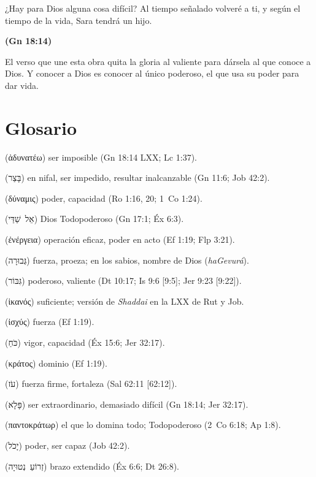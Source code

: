 \documentclass[11pt,letterpaper]{article}
\newcommand{\heb}[1]{\mbox{\foreignlanguage{hebrew}{#1}}}
\newcommand{\grc}[1]{\foreignlanguage{ancientgreek}{#1}}
\newcommand{\fuente}[1]{\par\hfill{\upshape\bfseries\small\textcolor{azul}{#1}}}
\begin{document}
\begin{cita}¿Hay para Dios alguna cosa difícil? Al tiempo señalado volveré a ti, y según el tiempo de la vida, Sara tendrá un hijo.\fuente{(Gn 18:14)}\end{cita}

El verso que une esta obra quita la gloria al valiente para dársela al que conoce a Dios. Y conocer a Dios es conocer al único poderoso, el que usa su poder para dar vida.

\section*{Glosario}

\begin{description}\setlength{\itemsep}{2pt}
\item[\emph{Adynatéō}] (\grc{ἀδυνατέω}) ser imposible (Gn 18:14 LXX; Lc 1:37).
\item[\emph{Batsar}] (\heb{בָּצַר}) en nifal, ser impedido, resultar inalcanzable (Gn 11:6; Job 42:2).
\item[\emph{Dýnamis}] (\grc{δύναμις}) poder, capacidad (Ro 1:16, 20; 1~Co 1:24).
\item[\emph{El Shaddai}] (\heb{אֵל שַׁדַּי}) Dios Todopoderoso (Gn 17:1; Éx 6:3).
\item[\emph{Enérgeia}] (\grc{ἐνέργεια}) operación eficaz, poder en acto (Ef 1:19; Flp 3:21).
\item[\emph{Gevurá}] (\heb{גְּבוּרָה}) fuerza, proeza; en los sabios, nombre de Dios (\emph{haGevurá}).
\item[\emph{Gibbor}] (\heb{גִּבּוֹר}) poderoso, valiente (Dt 10:17; Is 9:6 [9:5]; Jer 9:23 [9:22]).
\item[\emph{Hikanós}] (\grc{ἱκανός}) suficiente; versión de \emph{Shaddai} en la LXX de Rut y Job.
\item[\emph{Ischýs}] (\grc{ἰσχύς}) fuerza (Ef 1:19).
\item[\emph{Kóaj}] (\heb{כֹּחַ}) vigor, capacidad (Éx 15:6; Jer 32:17).
\item[\emph{Krátos}] (\grc{κράτος}) dominio (Ef 1:19).
\item[\emph{Oz}] (\heb{עֹז}) fuerza firme, fortaleza (Sal 62:11 [62:12]).
\item[\emph{Palá}] (\heb{פָּלָא}) ser extraordinario, demasiado difícil (Gn 18:14; Jer 32:17).
\item[\emph{Pantokrátōr}] (\grc{παντοκράτωρ}) el que lo domina todo; Todopoderoso (2~Co 6:18; Ap 1:8).
\item[\emph{Yajol}] (\heb{יָכֹל}) poder, ser capaz (Job 42:2).
\item[\emph{Zeróa netuyá}] (\heb{זְרוֹעַ נְטוּיָה}) brazo extendido (Éx 6:6; Dt 26:8).
\end{description}
\end{document}
